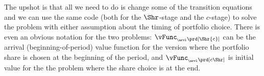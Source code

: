 The upshot is that all we need to do is change some of the transition equations and we can use the same code (both for the $\Shr$-stage and the ${c}$-stage) to solve the problem with either assumption about the timing of portfolio choice.  There is even an obvious notation for the two problems: $\vFunc_{_\arvl\prd[\Shr{c}]}$ can be the arrival (beginning-of-period) value function for the version where the portfolio share is chosen at the beginning of the period, and $\vFunc_{_\arvl\prd[{c}\Shr]}$ is initial value for the the problem where the share choice is at the end.






